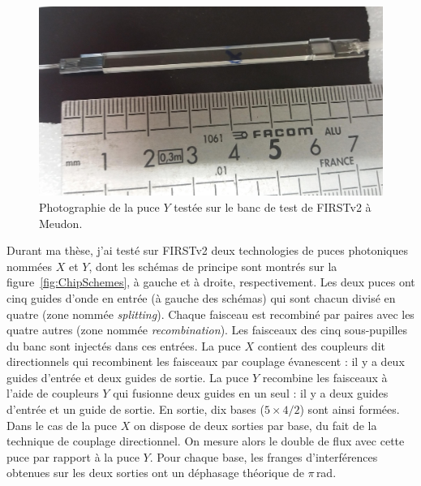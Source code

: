 \begin{figure}[ht!]
    \centering
    \includegraphics[width=\figwidth]{Figure_Chap2/PhotonicChip_5T_YComb_Meudon_04_crop.jpg}
    \caption[Photographie de la puce $Y$ testée sur le banc de test de FIRSTv2 à Meudon.]{Photographie de la puce $Y$ testée sur le banc de test de FIRSTv2 à Meudon.}
    \label{fig:ChipYPhoto}
\end{figure}

Durant ma thèse, j'ai testé \citep{barjot2020} sur \ac{FIRSTv2} deux technologies de puces photoniques nommées $X$ et $Y$, dont les schémas de principe sont montrés sur la figure~\ref{fig:ChipSchemes}, à gauche et à droite, respectivement. Les deux puces ont cinq guides d'onde en entrée (à gauche des schémas) qui sont chacun divisé en quatre (zone nommée \textit{splitting}). Chaque faisceau est recombiné par paires avec les quatre autres (zone nommée \textit{recombination}). Les faisceaux des cinq sous-pupilles du banc sont injectés dans ces entrées. La puce $X$ contient des coupleurs dit directionnels qui recombinent les faisceaux par couplage évanescent : il y a deux guides d'entrée et deux guides de sortie. La puce $Y$ recombine les faisceaux à l'aide de coupleurs $Y$ qui fusionne deux guides en un seul : il y a deux guides d'entrée et un guide de sortie. En sortie, dix bases ($5 \times 4 / 2$) sont ainsi formées. Dans le cas de la puce $X$ on dispose de deux sorties par base, du fait de la technique de couplage directionnel. On mesure alors le double de flux avec cette puce par rapport à la puce $Y$. Pour chaque base, les franges d'interférences obtenues sur les deux sorties ont un déphasage théorique de $\pi \,$rad.

